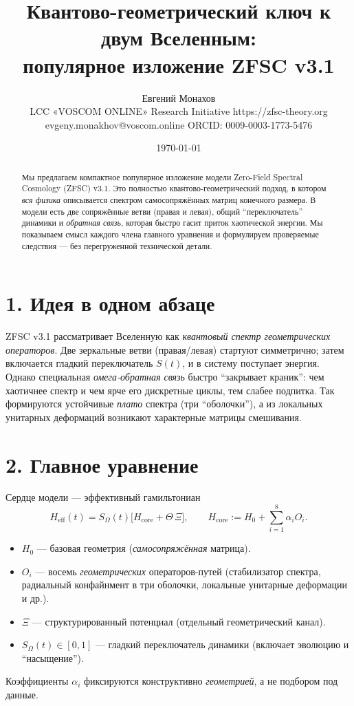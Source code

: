 \documentclass[a4paper,12pt]{article}
\title{Квантово-геометрический ключ к двум Вселенным: \\
популярное изложение ZFSC v3.1}
\author{Евгений Монахов \\ LCC «VOSCOM ONLINE» Research Initiative https://zfsc-theory.org\\ evgeny.monakhov@voscom.online ORCID: 0009-0003-1773-5476}
\date{\today}
\begin{document}
\maketitle

\begin{abstract}
Мы предлагаем компактное популярное изложение модели Zero-Field Spectral Cosmology (ZFSC) v3.1.
Это полностью квантово-геометрический подход, в котором \emph{вся физика} описывается спектром самосопряжённых матриц конечного размера.
В модели есть две сопряжённые ветви (правая и левая), общий ``переключатель'' динамики и \emph{обратная связь}, которая быстро гасит приток хаотической энергии.
Мы показываем смысл каждого члена главного уравнения и формулируем проверяемые следствия --- без перегруженной технической детали.
\end{abstract}

\section*{1. Идея в одном абзаце}
ZFSC v3.1 рассматривает Вселенную как \emph{квантовый спектр геометрических операторов}.
Две зеркальные ветви (правая/левая) стартуют симметрично; затем включается гладкий переключатель $S(t)$, и в систему поступает энергия.
Однако специальная \emph{омега-обратная связь} быстро ``закрывает краник'': чем хаотичнее спектр и чем ярче его дискретные циклы, тем слабее подпитка.
Так формируются устойчивые \emph{плато} спектра (три ``оболочки''), а из локальных унитарных деформаций возникают характерные матрицы смешивания.

\section*{2. Главное уравнение}
Сердце модели --- эффективный гамильтониан
\begin{equation}\label{eq:main}
H_{\mathrm{eff}}(t)=S_\Omega(t)\Big[H_{\mathrm{core}}+\Theta\,\Xi\Big],\qquad
H_{\mathrm{core}}:=H_0+\sum_{i=1}^{8}\alpha_i O_i.
\end{equation}
\vspace{-0.7em}
\begin{itemize}
  \item $H_0$ --- базовая геометрия (\emph{самосопряжённая} матрица).
  \item $O_i$ --- восемь \emph{геометрических} операторов-путей (стабилизатор спектра, радиальный конфайнмент в три оболочки, локальные унитарные деформации и др.).
  \item $\Xi$ --- структурированный потенциал (отдельный геометрический канал).
  \item $S_\Omega(t)\in[0,1]$ --- гладкий переключатель динамики (включает эволюцию и ``насыщение'').
\end{itemize}
Коэффициенты $\alpha_i$ фиксируются конструктивно \emph{геометрией}, а не подбором под данные.
\end{document}
